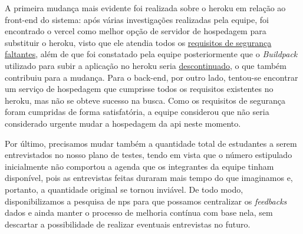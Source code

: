 A primeira mudança mais evidente foi realizada sobre o \gls{heroku} em relação ao \gls{front-end} do sistema: após várias investigações realizadas pela equipe, foi encontrado o \gls{vercel} como melhor opção de servidor de hospedagem para substituir o \gls{heroku}, visto que ele atendia todos os \href{https://vercel.com/blog/automatic-ssl-with-vercel-lets-encrypt}{requisitos de segurança faltantes}, além de que foi constatado pela equipe posteriormente que o \textsl{Buildpack} utilizado para subir a aplicação no \gls{heroku} seria \href{https://github.com/mars/create-react-app-buildpack}{descontinuado}, o que também contribuiu para a mudança. Para o \gls{back-end}, por outro lado, tentou-se encontrar um serviço de hospedagem que cumprisse todos os requisitos existentes no \gls{heroku}, mas não se obteve sucesso na busca. Como os requisitos de segurança foram cumpridas de forma satisfatória, a equipe considerou que não seria considerado urgente mudar a hospedagem da \gls{api} neste momento.

Por último, precisamos mudar também a quantidade total de estudantes a serem entrevistados no nosso plano de testes, tendo em vista que o número estipulado inicialmente não comportou a agenda que os integrantes da equipe tinham disponível, pois as entrevistas feitas duraram mais tempo do que imaginamos e, portanto, a quantidade original se tornou inviável. De todo modo, disponibilizamos a pesquisa de \acs{nps} para que possamos centralizar os \textit{feedbacks} dados e ainda manter o processo de melhoria contínua com base nela, sem descartar a possibilidade de realizar eventuais entrevistas no futuro.